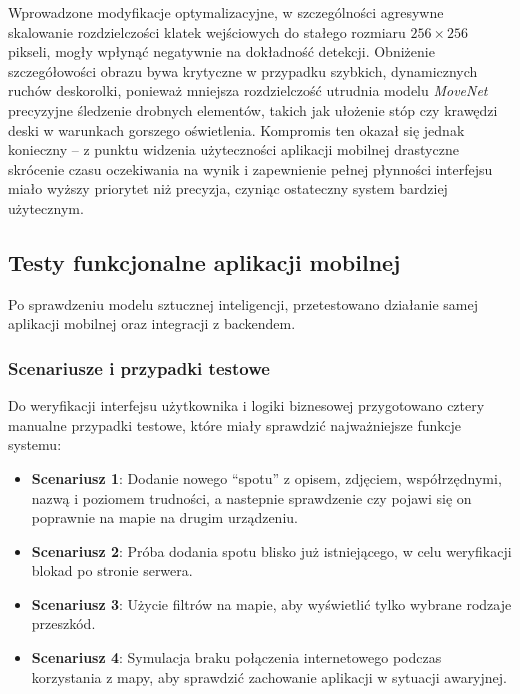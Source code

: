 Wprowadzone modyfikacje optymalizacyjne, w szczególności agresywne skalowanie rozdzielczości klatek wejściowych do stałego rozmiaru $256\times256$ pikseli, mogły wpłynąć negatywnie na dokładność detekcji. Obniżenie szczegółowości obrazu bywa krytyczne w przypadku szybkich, dynamicznych ruchów deskorolki, ponieważ mniejsza rozdzielczość utrudnia modelu \textit{MoveNet} precyzyjne śledzenie drobnych elementów, takich jak ułożenie stóp czy krawędzi deski w warunkach gorszego oświetlenia. Kompromis ten okazał się jednak konieczny – z punktu widzenia użyteczności aplikacji mobilnej drastyczne skrócenie czasu oczekiwania na wynik i zapewnienie pełnej płynności interfejsu miało wyższy priorytet niż precyzja, czyniąc ostateczny system bardziej użytecznym.
            
    \subsection{Testy funkcjonalne aplikacji mobilnej}

            Po sprawdzeniu modelu sztucznej inteligencji, przetestowano działanie samej aplikacji mobilnej oraz integracji z backendem.

            \subsubsection{Scenariusze i przypadki testowe}

                Do weryfikacji interfejsu użytkownika i logiki biznesowej przygotowano cztery manualne przypadki testowe, które miały sprawdzić najważniejsze funkcje systemu:
                \begin{itemize}
                    \item \textbf{Scenariusz 1}: Dodanie nowego \enquote{spotu} z opisem, zdjęciem, współrzędnymi, nazwą i poziomem trudności, a nastepnie sprawdzenie czy pojawi się on poprawnie na mapie na drugim urządzeniu.
                    \item \textbf{Scenariusz 2}: Próba dodania spotu blisko już istniejącego, w celu weryfikacji blokad po stronie serwera.
                    \item \textbf{Scenariusz 3}: Użycie filtrów na mapie, aby wyświetlić tylko wybrane rodzaje przeszkód.
                    \item \textbf{Scenariusz 4}: Symulacja braku połączenia internetowego podczas korzystania z mapy, aby sprawdzić zachowanie aplikacji w sytuacji awaryjnej.
                \end{itemize}

